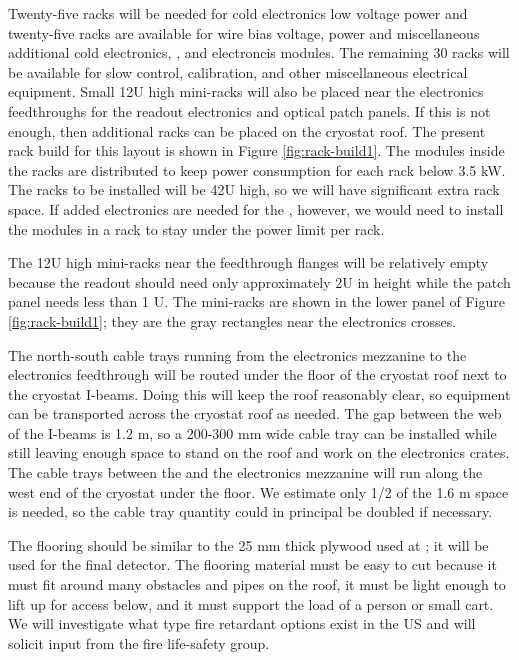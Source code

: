 Twenty-five racks will be needed for cold electronics low voltage power and twenty-five racks are available for  wire bias voltage,  power and miscellaneous additional cold electronics, , and   electroncis modules. 
The remaining 30 racks will be available for slow control, calibration, and other miscellaneous electrical equipment. 
Small 12U high mini-racks will also be placed near the electronics feedthroughs for the  readout electronics and optical patch panels. 
If this is not enough, then additional racks can be placed on the cryostat roof. 
The present rack build for this layout is shown in Figure \ref{fig:rack-build1}. The modules inside the racks are distributed to keep power consumption for each rack below 3.5 \si{kW}.
The racks to be installed will be 42U high, so we will have significant extra rack space.  If added electronics are needed for the , however, we would need to install the modules in a  rack to stay under the power limit per rack.

The 12U high mini-racks near the feedthrough flanges will be relatively empty because the  readout should need only approximately 2U in height while the  patch panel needs less than 1 U. The mini-racks are shown in the lower panel of Figure \ref{fig:rack-build1}; they are the gray rectangles near the electronics crosses.

The north-south cable trays running from the electronics mezzanine to the electronics feedthrough will be routed under the floor of the cryostat roof next to the cryostat I-beams. 
Doing this will keep the roof reasonably clear, so equipment can be transported across the cryostat roof as needed. 
The gap between the web of the I-beams is 1.2 \si{m}, so a 200-300 \si{mm} wide cable tray can be installed while still leaving enough space to stand on the roof and work on the electronics crates. 
The cable trays between the  and the electronics mezzanine will run along the west end of the cryostat under the floor. 
We estimate only 1/2 of the 1.6 \si{m} space is needed, so the cable tray quantity could in principal be doubled if necessary. 

The flooring should be similar to the 25 \si{mm} thick plywood used at ; it will be used for the final  detector. 
The flooring material must be easy to cut because it must fit around many obstacles and pipes on the roof, it must be light enough to lift up for access below, and it must support the load of a person or small cart. 
We will investigate what type fire retardant options exist in the US and will solicit input from the  fire life-safety group. 

